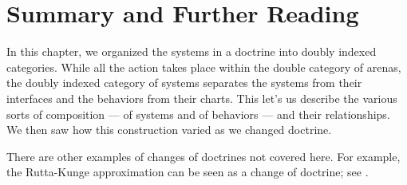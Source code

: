\documentclass[DynamicalBook]{subfiles}
\begin{document}
\section{Summary and Further Reading}

In this chapter, we organized the systems in a doctrine into doubly indexed
categories. While all the action takes place within the double category of
arenas, the doubly indexed category of systems separates the systems from their
interfaces and the behaviors from their charts. This let's us describe the
various sorts of composition --- of systems and of behaviors --- and their
relationships. We then saw how this construction varied as we changed doctrine.

There are other examples of changes of doctrines not covered here. For example,
the Rutta-Kunge approximation can be seen as a change of doctrine; see \cite{ngotiaoco2017compositionality}.
\end{document}
